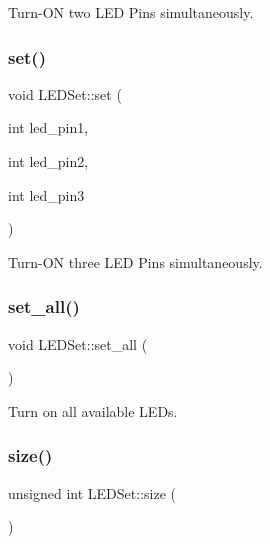Turn-\/\+ON two L\+ED Pins simultaneously. 

\mbox{\label{classLEDSet_ae2b77e5323305d3598c33e45e14c8cb4}} 
\subsubsection{\texorpdfstring{set()}{set()}\hspace{0.1cm}{\footnotesize\ttfamily [3/3]}}
{\footnotesize\ttfamily void L\+E\+D\+Set\+::set (\begin{DoxyParamCaption}\item[{int}]{led\+\_\+pin1,  }\item[{int}]{led\+\_\+pin2,  }\item[{int}]{led\+\_\+pin3 }\end{DoxyParamCaption})\hspace{0.3cm}{\ttfamily [inline]}}



Turn-\/\+ON three L\+ED Pins simultaneously. 

\mbox{\label{classLEDSet_a9d54d89134276744267b15d362debf44}} 
\subsubsection{\texorpdfstring{set\+\_\+all()}{set\_all()}}
{\footnotesize\ttfamily void L\+E\+D\+Set\+::set\+\_\+all (\begin{DoxyParamCaption}{ }\end{DoxyParamCaption})\hspace{0.3cm}{\ttfamily [inline]}}



Turn on all available L\+E\+Ds. 

\mbox{\label{classLEDSet_ad7a588c0ad5a73ef70cb465b39f83e0b}} 
\subsubsection{\texorpdfstring{size()}{size()}}
{\footnotesize\ttfamily unsigned int L\+E\+D\+Set\+::size (\begin{DoxyParamCaption}{ }\end{DoxyParamCaption})\hspace{0.3cm}{\ttfamily [inline]}}



